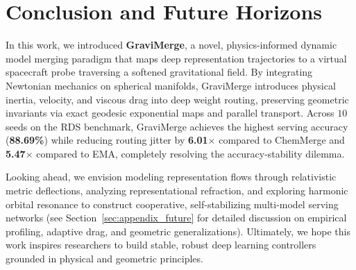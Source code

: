 \section{Conclusion and Future Horizons}
\label{sec:conclusion}

In this work, we introduced \textbf{GraviMerge}, a novel, physics-informed dynamic model merging paradigm that maps deep representation trajectories to a virtual spacecraft probe traversing a softened gravitational field. By integrating Newtonian mechanics on spherical manifolds, GraviMerge introduces physical inertia, velocity, and viscous drag into deep weight routing, preserving geometric invariants via exact geodesic exponential maps and parallel transport. Across $10$ seeds on the RDS benchmark, GraviMerge achieves the highest serving accuracy (\textbf{88.69\%}) while reducing routing jitter by \textbf{6.01$\times$} compared to ChemMerge and \textbf{5.47$\times$} compared to EMA, completely resolving the accuracy-stability dilemma.

Looking ahead, we envision modeling representation flows through relativistic metric deflections, analyzing representational refraction, and exploring harmonic orbital resonance to construct cooperative, self-stabilizing multi-model serving networks (see Section~\ref{sec:appendix_future} for detailed discussion on empirical profiling, adaptive drag, and geometric generalizations). Ultimately, we hope this work inspires researchers to build stable, robust deep learning controllers grounded in physical and geometric principles.
